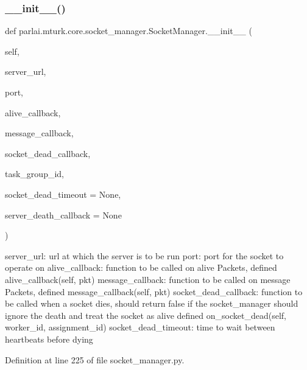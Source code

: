 \subsubsection{\texorpdfstring{\+\_\+\+\_\+init\+\_\+\+\_\+()}{\_\_init\_\_()}}
{\footnotesize\ttfamily def parlai.\+mturk.\+core.\+socket\+\_\+manager.\+Socket\+Manager.\+\_\+\+\_\+init\+\_\+\+\_\+ (\begin{DoxyParamCaption}\item[{}]{self,  }\item[{}]{server\+\_\+url,  }\item[{}]{port,  }\item[{}]{alive\+\_\+callback,  }\item[{}]{message\+\_\+callback,  }\item[{}]{socket\+\_\+dead\+\_\+callback,  }\item[{}]{task\+\_\+group\+\_\+id,  }\item[{}]{socket\+\_\+dead\+\_\+timeout = {\ttfamily None},  }\item[{}]{server\+\_\+death\+\_\+callback = {\ttfamily None} }\end{DoxyParamCaption})}

\begin{DoxyVerb}server_url:           url at which the server is to be run
port:                 port for the socket to operate on
alive_callback:       function to be called on alive Packets, defined
               alive_callback(self, pkt)
message_callback:     function to be called on message Packets, defined
               message_callback(self, pkt)
socket_dead_callback: function to be called when a socket dies, should
              return false if the socket_manager should ignore
              the death and treat the socket as alive defined
               on_socket_dead(self, worker_id, assignment_id)
socket_dead_timeout:  time to wait between heartbeats before dying
\end{DoxyVerb}
 

Definition at line 225 of file socket\+\_\+manager.\+py.



